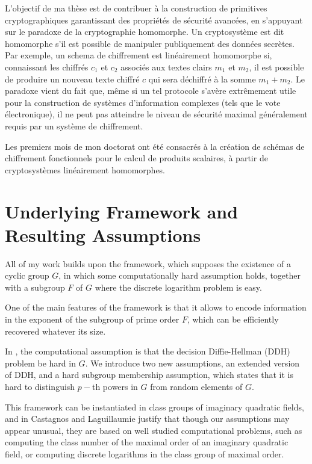 \documentclass[11pt]{llncs}
\begin{document}
{L'objectif de ma thèse est de contribuer à la construction de primitives cryptographiques garantissant des propriétés de sécurité avancées, en s'appuyant sur le paradoxe de la cryptographie homomorphe. Un cryptosystème est dit homomorphe s'il est possible de manipuler publiquement des données secrètes. Par exemple, un schema de chiffrement est linéairement homomorphe si, connaissant les chiffrés $ c_1 $ et $ c_2 $ associés aux textes clairs $ m_1 $ et $ m_2 $, il est possible de produire un nouveau texte chiffré $ c $ qui sera déchiffré à la somme $ m_1 + m_2 $. Le paradoxe vient du fait que, même si un tel protocole s’avère extrêmement utile pour la construction de systèmes d’information complexes (tels que le vote électronique), il ne peut pas atteindre le niveau de sécurité maximal généralement requis par un système de chiffrement.

Les premiers mois de mon doctorat ont été consacrés à la création de schémas de chiffrement fonctionnels pour le calcul de produits scalaires, à partir de cryptosystèmes linéairement homomorphes.}
\section{Underlying Framework and Resulting Assumptions}\label{section:framework}
All of my work builds upon the \cite{RSA:CasLag15} framework, which supposes the existence of a cyclic group $G$, in which some computationally hard assumption holds, together with a subgroup $F$ of $G$ where the discrete logarithm problem is easy.

One of the main features of the framework is that it allows to encode information in the exponent of the subgroup of prime order $F$, which can be efficiently recovered whatever its size.

In \cite{RSA:CasLag15}, the computational assumption is that the decision Diffie-Hellman (DDH) problem be hard in $G$. We introduce two new assumptions, an extended version of DDH,  and a hard subgroup membership assumption, which states that it is hard to distinguish $p-$th powers in $G$ from random elements of $G$.

This framework can be instantiated in class groups of imaginary quadratic fields, and in \cite{RSA:CasLag15} Castagnos and Laguillaumie justify that though our assumptions may appear unusual, they are based on well studied computational problems, such as computing the class number of the maximal order of an imaginary quadratic field, or computing discrete logarithms in the class group of maximal order.
\end{document}
